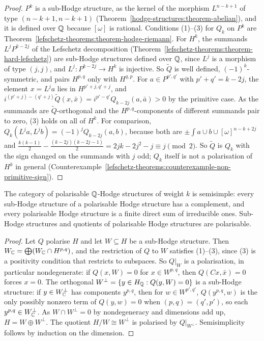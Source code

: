 \begin{proof}
$P^k$ is a sub-Hodge structure, as the kernel of the morphism $L^{n-k+1}$ of type $(n-k+1, n-k+1)$ (Theorem~\ref{hodge-structures:theorem-abelian}), and it is defined over $\mathbb{Q}$ because $[\omega]$
is rational. Conditions (1)--(3) for $Q_k$ on $P^k$ are Theorem~\ref{lefschetz-theorems:theorem-hodge-riemann}. For $H^k$, the summands $L^jP^{k-2j}$ of the Lefschetz decomposition
(Theorem~\ref{lefschetz-theorems:theorem-hard-lefschetz}) are sub-Hodge structures defined over $\mathbb{Q}$, since $L^j$ is a morphism of type $(j,j)$, and $L^j \colon P^{k-2j} \to H^k$ is injective. So
$\tilde Q$ is well defined, $(-1)^k$-symmetric, and pairs $H^{p,q}$ only with $H^{q,p}$. For $a \in P^{p',q'}$ with $p' + q' = k - 2j$, the element $x = L^ja$ lies in $H^{p'+j,q'+j}$, and
$i^{(p'+j)-(q'+j)}\tilde Q(x, \bar x) = i^{p'-q'}Q_{k-2j}(a, \bar a) > 0$ by the primitive case. As the summands are $\tilde Q$-orthogonal and the $H^{p,q}$-components of different summands
pair to zero, (3) holds on all of $H^k$. For comparison, $Q_k(L^ja, L^jb) = (-1)^jQ_{k-2j}(a, b)$, because both are $\pm\int a \cup b \cup [\omega]^{n-k+2j}$ and
$\frac{k(k-1)}{2} - \frac{(k-2j)(k-2j-1)}{2} = 2jk - 2j^2 - j \equiv j \pmod 2$. So $\tilde Q$ is $Q_k$ with the sign changed on the summands with $j$ odd; $Q_k$ itself is not a polarisation of $H^k$ in
general (Counterexample~\ref{lefschetz-theorems:counterexample-non-primitive-sign}).
\end{proof}

\begin{theorem}\label{hodge-structures:theorem-semisimple}
The category of polarisable $\mathbb{Q}$-Hodge structures of weight $k$ is semisimple: every sub-Hodge structure of a polarisable Hodge structure has a complement, and every polarisable Hodge structure is a
finite direct sum of irreducible ones. Sub-Hodge structures and quotients of polarisable Hodge structures are polarisable.
\end{theorem}

\begin{proof}
Let $Q$ polarise $H$ and let $W \subseteq H$ be a sub-Hodge structure. Then $W_{\mathbb{C}} = \bigoplus(W_{\mathbb{C}} \cap H^{p,q})$, and the restriction of $Q$ to $W$ satisfies (1)--(3), since (3) is a positivity
condition that restricts to subspaces. So $Q|_W$ is a polarisation, in particular nondegenerate: if $Q(x, W) = 0$ for $x \in W^{p,q}$, then $Q(Cx, \bar x) = 0$ forces $x = 0$. The orthogonal
$W^\perp = \{y \in H_{\mathbb{Q}} : Q(y, W) = 0\}$ is a sub-Hodge structure: if $y \in W^\perp_{\mathbb{C}}$ has components $y^{p,q}$, then for $w \in W^{p',q'}$, $Q(y^{p,q}, w)$ is the only possibly nonzero term of
$Q(y, w) = 0$ when $(p, q) = (q', p')$, so each $y^{p,q} \in W^\perp_{\mathbb{C}}$. As $W \cap W^\perp = 0$ by nondegeneracy and dimensions add up, $H = W \oplus W^\perp$. The quotient $H/W \cong W^\perp$ is
polarised by $Q|_{W^\perp}$. Semisimplicity follows by induction on the dimension.
\end{proof}

